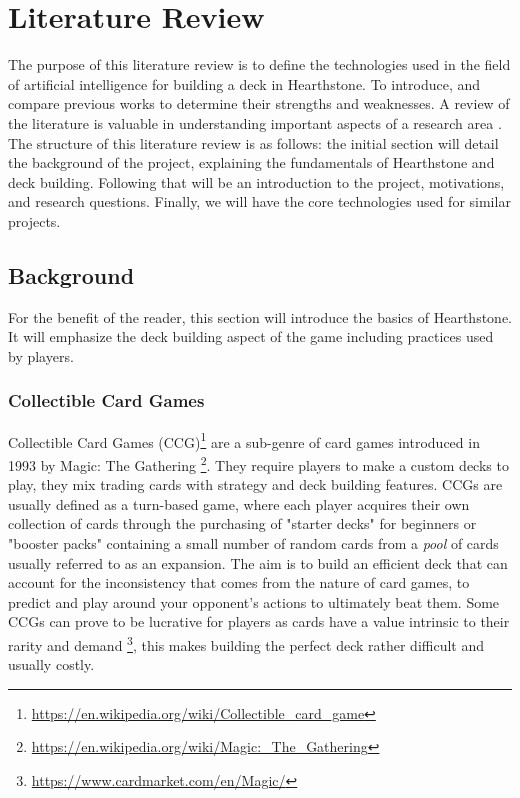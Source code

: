\documentclass{report} %
\begin{document}
\chapter{Literature Review}
The purpose of this literature review is to define the technologies used in the field of artificial intelligence for building a deck in Hearthstone. To introduce, and compare previous works to determine their strengths and weaknesses. A review of the literature is valuable in understanding important aspects of a research area \cite{Isaacs2020}. The structure of this literature review is as follows: the initial section will detail the background of the project, explaining the fundamentals of Hearthstone and deck building. Following that will be an introduction to the project,  motivations, and research questions. Finally, we will have the core technologies used for similar projects.
\section{Background}
	For the benefit of the reader, this section will introduce the basics of Hearthstone. It will emphasize the deck building aspect of the game including practices used by players.  
\subsection{Collectible Card Games}
	Collectible Card Games (CCG)\footnote{\url{https://en.wikipedia.org/wiki/Collectible_card_game}} are a sub-genre of card games introduced in 1993 by Magic: The Gathering \footnote{\url{https://en.wikipedia.org/wiki/Magic:_The_Gathering}}. They require players to make a custom decks to play, they mix trading cards with strategy and deck building features. CCGs are usually defined as a turn-based game, where each player acquires their own collection of cards through the purchasing of "starter decks" for beginners or "booster packs" containing a small number of random cards from a {\it{pool}} of cards usually referred to as an expansion. The aim is to build an efficient deck that can account for the inconsistency that comes from the nature of card games, to predict and play around your opponent's actions to ultimately beat them. Some CCGs can prove to be lucrative for players as cards have a value intrinsic to their rarity and demand \footnote{\url{https://www.cardmarket.com/en/Magic/}}, this makes building the perfect deck rather difficult and usually costly.
\end{document}
